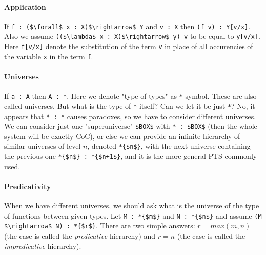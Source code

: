 \documentclass[11pt,oneside]{article}
\begin{document}
\paragraph{Application}\sloppy
If \lstinline[mathescape=true]|f : ($\forall$ x : X)$\rightarrow$ Y| and \lstinline[mathescape=true]|v : X|  then \lstinline[mathescape=true]|(f v) : Y[v/x]|.
Also we assume \lstinline[mathescape=true]|(($\lambda$ x : X)$\rightarrow$ y) v|
to be equal to \lstinline[mathescape=true]|y[v/x]|.
Here \lstinline[mathescape=true]|f[v/x]| denote the substitution of the term \lstinline[mathescape=true]|v| in place of all
occurencies of the variable \lstinline[mathescape=true]|x| in the term \lstinline[mathescape=true]|f|.

\paragraph{Universes}
If \lstinline[mathescape=true]|a : A| then \lstinline[mathescape=true]|A : *|.
Here we denote "type of types" as \lstinline[mathescape=true]|*| symbol.
These are also called universes.
But what is the type of \lstinline[mathescape=true]|*| itself? Can we let it be just \lstinline[mathescape=true]|*|?
No, it appears that \lstinline[mathescape=true]|* : *| causes paradoxes, so
we have to consider different universes.
We can consider just one "superuniverse" \lstinline[mathescape=true]|$BOX$| with \lstinline[mathescape=true]|* : $BOX$|
(then the whole system will be exactly CoC),
or else we can provide an infinite hierarchy of similar universes
of level $n$, denoted \lstinline[mathescape=true]|*{$n$}|,
with the next universe containing the previous one \lstinline[mathescape=true]|*{$n$} : *{$n+1$}|,
and it is the more general PTS commonly used.

\paragraph{Predicativity}
When we have different universes, we should ask what is the universe
of the type of functions between given types.
Let \lstinline[mathescape=true]|M : *{$m$}| and \lstinline[mathescape=true]|N : *{$n$}| and assume \lstinline[mathescape=true]|(M $\rightarrow$ N) : *{$r$}|.
There are two simple answers:
$r = max (m, n)$ (the case is called the {\em predicative} hierarchy) and
$r = n$ (the case is called the {\em impredicative} hierarchy).
\end{document}
